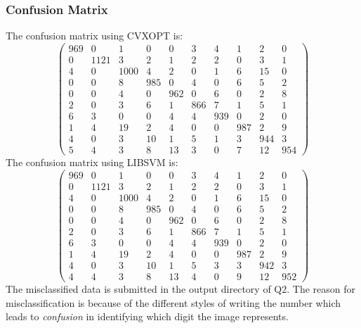 \documentclass[11pt]{article}
\begin{document}
\subsubsection{Confusion Matrix}
The confusion matrix using CVXOPT is:
\begin{equation}
  \begin{pmatrix}
    969 & 0 & 1 & 0 & 0 & 3 & 4 & 1 & 2 & 0\\
    0 & 1121 & 3 & 2 & 1 & 2 & 2 & 0 & 3 & 1\\
    4 & 0 & 1000 & 4 & 2 & 0 & 1 & 6 & 15 & 0\\
    0 & 0 & 8 & 985 & 0 & 4 & 0 & 6 & 5 & 2\\
    0 & 0 & 4 & 0 & 962 & 0 & 6 & 0 & 2 & 8\\
    2 & 0 & 3 & 6 & 1 & 866 & 7 & 1 & 5 & 1\\
    6 & 3 & 0 & 0 & 4 & 4 & 939 & 0 & 2 & 0\\
    1 & 4 & 19 & 2 & 4 & 0 & 0 & 987 & 2 & 9\\
    4 & 0 & 3 & 10 & 1 & 5 & 1 & 3 & 944 & 3\\
    5 & 4 & 3 & 8 & 13 & 3 & 0 & 7 &12 & 954
  \end{pmatrix}
\end{equation}
The confusion matrix using LIBSVM is:
\begin{equation}
  \begin{pmatrix}
    969 & 0 & 1 & 0 & 0 & 3 & 4 & 1 & 2 & 0\\
    0 & 1121 & 3 & 2 & 1 & 2 & 2 & 0 & 3 & 1\\
    4 & 0 & 1000 & 4 & 2 & 0 & 1 & 6 & 15 & 0\\
    0 & 0 & 8 & 985 & 0 & 4 & 0 & 6 & 5 & 2\\
    0 & 0 & 4 & 0 & 962 & 0 & 6 & 0 & 2 & 8\\
    2 & 0 & 3 & 6 & 1 & 866 & 7 & 1 & 5 & 1\\
    6 & 3 & 0 & 0 & 4 & 4 & 939 & 0 & 2 & 0\\
    1 & 4 & 19 & 2 & 4 & 0 & 0 & 987 & 2 & 9\\
    4 & 0 & 3 & 10 & 1 & 5 & 3 & 3 & 942 & 3\\
    4 & 4 & 3 & 8 & 13 & 4 & 0 & 9 & 12 & 952
  \end{pmatrix}
\end{equation}
The misclassified data is submitted in the output directory of Q2. The reason for misclassification is because of the different styles of writing the number which leads to \textit{confusion} in identifying which digit the image represents.
\end{document}

